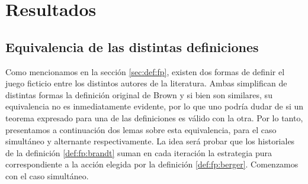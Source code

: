 \chapter{Resultados}  \label{cap:aportes}

\section{Equivalencia de las distintas definiciones} \label{sec:aportes:equivalencia}

Como mencionamos en la sección \ref{sec:def:fp}, existen dos formas de definir el juego ficticio entre los distintos autores de la literatura. Ambas simplifican de distintas formas la definición original de Brown y si bien son similares, su equivalencia no es inmediatamente evidente, por lo que uno podría dudar de si un teorema expresado para una de las definiciones es válido con la otra. Por lo tanto, presentamos a continuación dos lemas sobre esta equivalencia, para el caso simultáneo y alternante respectivamente. La idea será probar que los historiales de la definición \ref{def:fp:brandt} suman en cada iteración la estrategia pura correspondiente a la acción elegida por la definición \ref{def:fp:berger}. Comenzamos con el caso simultáneo.


